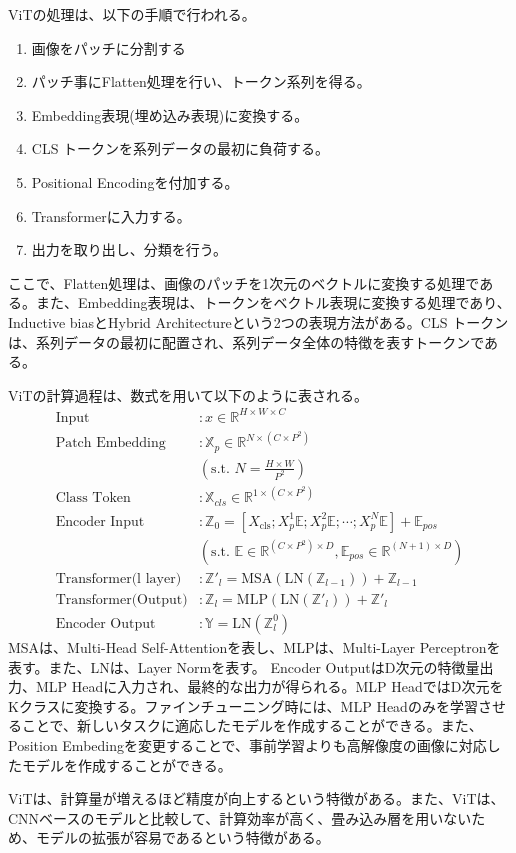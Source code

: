 \documentclass{ltjsarticle}
\begin{document}
ViTの処理は、以下の手順で行われる。
\begin{enumerate}
  \item 画像をパッチに分割する
  \item パッチ事にFlatten処理を行い、トークン系列を得る。
  \item Embedding表現(埋め込み表現)に変換する。
  \item CLS トークンを系列データの最初に負荷する。
  \item Positional Encodingを付加する。
  \item Transformerに入力する。
  \item 出力を取り出し、分類を行う。
\end{enumerate}
ここで、Flatten処理は、画像のパッチを1次元のベクトルに変換する処理である。また、Embedding表現は、トークンをベクトル表現に変換する処理であり、Inductive biasとHybrid Architectureという2つの表現方法がある。CLS トークンは、系列データの最初に配置され、系列データ全体の特徴を表すトークンである。
\par
ViTの計算過程は、数式を用いて以下のように表される。
\begin{align}
  \text{Input} & : x \in \mathbb{R}^{H \times W \times C}\\
  \text{Patch Embedding} & : \mathbb{X}_p \in \mathbb{R}^{N \times (C \times P^2)}\\
  & \left( \text{s.t. }  N = \frac{H \times W}{P^2} \right) \\ 
  \text{Class Token} & : \mathbb{X}_{cls} \in \mathbb{R}^{1 \times (C \times P^2)}\\
  \text{Encoder Input} & : \mathbb{Z}_0 = \left[ X_{\text{cls}}; X_p^1 \mathbb{E}; X_p^2 \mathbb{E}; \cdots ;X_p^N \mathbb{E} \right] + \mathbb{E}_{pos}\\
  & \left( \text{s.t. }  \mathbb{E} \in \mathbb{R}^{(C \times P^2) \times D}, \mathbb{E}_{pos} \in \mathbb{R}^{(N+1) \times D} \right)\\
  \text{Transformer(l layer)} &: \mathbb{Z'}_l = \text{MSA}( \text{LN}(\mathbb{Z}_{l-1}) ) + \mathbb{Z}_{l-1}\\ 
  \text{Transformer(Output)} & : \mathbb{Z}_l = \text{MLP}(\text{LN}(\mathbb{Z'}_l)) + \mathbb{Z'}_l\\
  \text{Encoder Output} & : \mathbb{Y} = \text{LN}(\mathbb{Z}_l^0) 
\end{align}
MSAは、Multi-Head Self-Attentionを表し、MLPは、Multi-Layer Perceptronを表す。また、LNは、Layer Normを表す。
Encoder OutputはD次元の特徴量出力、MLP Headに入力され、最終的な出力が得られる。MLP HeadではD次元をKクラスに変換する。ファインチューニング時には、MLP Headのみを学習させることで、新しいタスクに適応したモデルを作成することができる。また、Position Embedingを変更することで、事前学習よりも高解像度の画像に対応したモデルを作成することができる。
\par
ViTは、計算量が増えるほど精度が向上するという特徴がある。また、ViTは、CNNベースのモデルと比較して、計算効率が高く、畳み込み層を用いないため、モデルの拡張が容易であるという特徴がある。
\end{document}
